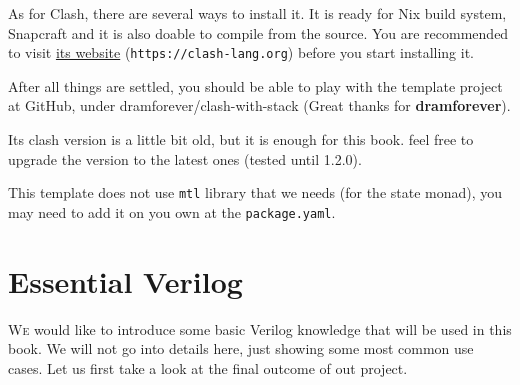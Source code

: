 \documentclass[a4paper,12pt, oneside]{book}
\begin{document}
As for Clash, there are several ways to install it. It is ready for Nix build system, Snapcraft and it is also doable to compile from the source. You are recommended to visit \href{https://clash-lang.org}{its website} (\texttt{https://clash-lang.org}) before you start installing it.

After all things are settled, you should be able to play with the template project at GitHub, under dramforever/clash-with-stack (Great thanks for \textbf{dramforever}).

Its clash version is a little bit old, but it is enough for this book. feel free to upgrade the version to the latest ones (tested until 1.2.0).

This template does not use \texttt{mtl} library that we needs (for the state monad), you may need to add it on you own at the \texttt{package.yaml}.
\chapter{Essential Verilog}
\lettrine{W}{e} would like to introduce some basic Verilog knowledge that will be used in this book. We will not go into details here, just showing some most common use cases. Let us first take a look at the final outcome of out project.
\end{document}

